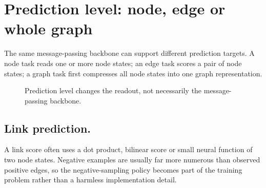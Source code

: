 \section{Prediction level: node, edge or whole graph}
The same message-passing backbone can support different prediction targets.
A node task reads one or more node states; an edge task scores a pair of node states; a graph task first compresses all node states into one graph representation.

\begin{figure}[htbp]
\centering
{}
\caption{Prediction level changes the readout, not necessarily the message-passing backbone.}
\label{fig:gnn-prediction-levels}
\end{figure}

\subsection{Link prediction.}
A link score often uses a dot product, bilinear score or small neural function of two node states.
Negative examples are usually far more numerous than observed positive edges, so the negative-sampling policy becomes part of the training problem rather than a harmless implementation detail.


